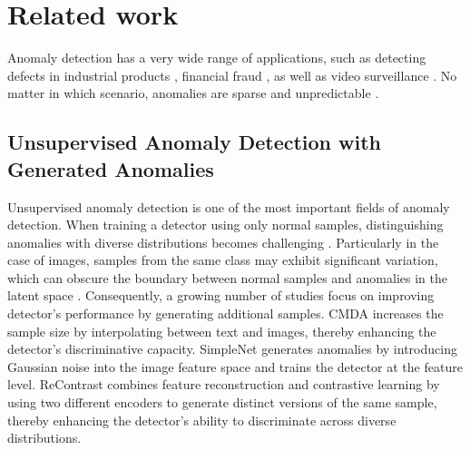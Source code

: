 \section{Related work}
\label{sec:RW}

Anomaly detection has a very wide range of applications, such as detecting defects in industrial products \cite{liu2024deep,roth2022towards,siegel2020industrial}, financial fraud \cite{hilal2022financial,huang2018codetect}, as well as video surveillance \cite{zhang2020normality,li2020spatial,chang2021contrastive}. No matter in which scenario, anomalies are sparse and unpredictable \cite{pang2021deep}. 


\subsection{Unsupervised Anomaly Detection with Generated Anomalies}
Unsupervised anomaly detection is one of the most important fields of anomaly detection. When training a detector using only normal samples, distinguishing anomalies with diverse distributions becomes challenging \cite{zong2018deep,sehwag2021ssd}. Particularly in the case of images, samples from the same class may exhibit significant variation, which can obscure the boundary between normal samples and anomalies in the latent space \cite{chen2024improvingg}. 
Consequently, a growing number of studies focus on improving detector's performance by generating additional samples.
CMDA \cite{chen2023cross} increases the sample size by interpolating between text and images, thereby enhancing the detector's discriminative capacity.
SimpleNet \cite{liu2023simplenet} generates anomalies by introducing Gaussian noise into the image feature space and trains the detector at the feature level.
ReContrast \cite{guo2024recontrast} combines feature reconstruction and contrastive learning by using two different encoders to generate distinct versions of the same sample, thereby enhancing the detector's ability to discriminate across diverse distributions.
